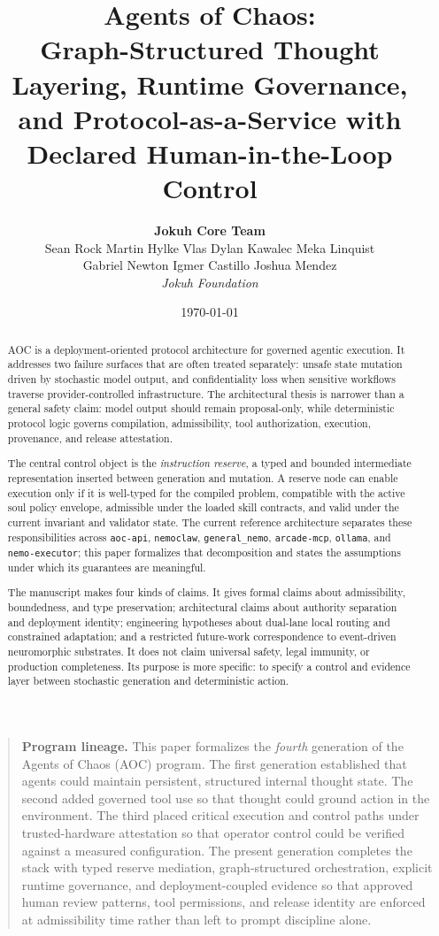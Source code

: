 \documentclass[11pt]{article}
\title{\textbf{Agents of Chaos:}\\
Graph-Structured Thought Layering, Runtime Governance,\\
and Protocol-as-a-Service with Declared Human-in-the-Loop Control}
\author{\textbf{Jokuh Core Team}\\[0.55ex]
  \normalsize\normalfont
  Sean Rock \quad Martin Hylke Vlas \quad Dylan Kawalec \quad Meka Linquist\\[0.25ex]
  Gabriel Newton \quad Igmer Castillo \quad Joshua Mendez\\[0.45ex]
  \textit{Jokuh Foundation}}
\date{\today}
\theoremstyle{remark}
\newcommand{\AOC}{\textup{\textsc{AOC}}}
\begin{document}
\maketitle
\thispagestyle{fancy}

\begin{quote}\small\raggedright
\textbf{Program lineage.} This paper formalizes the \emph{fourth} generation of the Agents of Chaos (\AOC{}) program. The first generation established that agents could maintain persistent, structured internal thought state. The second added governed tool use so that thought could ground action in the environment. The third placed critical execution and control paths under trusted-hardware attestation so that operator control could be verified against a measured configuration. The present generation completes the stack with typed reserve mediation, graph-structured orchestration, explicit runtime governance, and deployment-coupled evidence so that approved human review patterns, tool permissions, and release identity are enforced at admissibility time rather than left to prompt discipline alone.
\end{quote}
\medskip

\begin{abstract}\raggedright
\AOC{} is a deployment-oriented protocol architecture for governed agentic execution. It addresses two failure surfaces that are often treated separately: unsafe state mutation driven by stochastic model output, and confidentiality loss when sensitive workflows traverse provider-controlled infrastructure. The architectural thesis is narrower than a general safety claim: model output should remain proposal-only, while deterministic protocol logic governs compilation, admissibility, tool authorization, execution, provenance, and release attestation.

The central control object is the \emph{instruction reserve}, a typed and bounded intermediate representation inserted between generation and mutation. A reserve node can enable execution only if it is well-typed for the compiled problem, compatible with the active soul policy envelope, admissible under the loaded skill contracts, and valid under the current invariant and validator state. The current reference architecture separates these responsibilities across \texttt{aoc-api}, \texttt{nemoclaw}, \texttt{general\_nemo}, \texttt{arcade-mcp}, \texttt{ollama}, and \texttt{nemo-executor}; this paper formalizes that decomposition and states the assumptions under which its guarantees are meaningful.

The manuscript makes four kinds of claims. It gives formal claims about admissibility, boundedness, and type preservation; architectural claims about authority separation and deployment identity; engineering hypotheses about dual-lane local routing and constrained adaptation; and a restricted future-work correspondence to event-driven neuromorphic substrates. It does not claim universal safety, legal immunity, or production completeness. Its purpose is more specific: to specify a control and evidence layer between stochastic generation and deterministic action.
\end{abstract}
\end{document}
